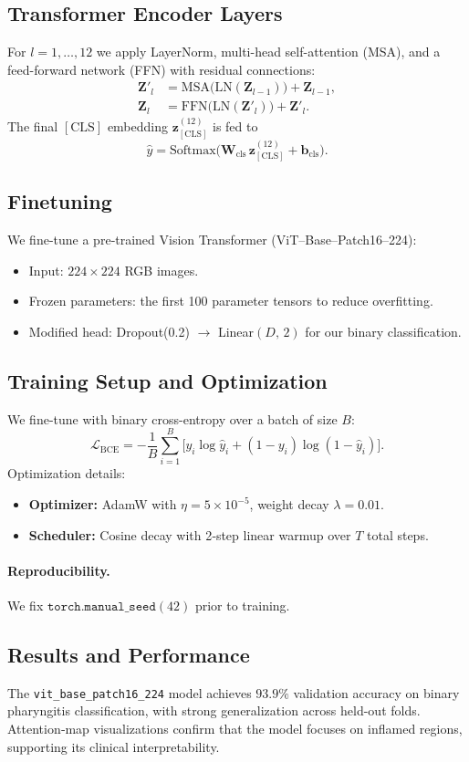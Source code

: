\subsection{Transformer Encoder Layers}
For \(l=1,\dots,12\) we apply LayerNorm, multi-head self-attention (MSA), and a feed-forward network (FFN) with residual connections:
\[
  \begin{aligned}
    \mathbf{Z}'_{l} &= \mathrm{MSA}\bigl(\mathrm{LN}(\mathbf{Z}_{l-1})\bigr) + \mathbf{Z}_{l-1},\\
    \mathbf{Z}_{l}  &= \mathrm{FFN}\bigl(\mathrm{LN}(\mathbf{Z}'_{l})\bigr)  + \mathbf{Z}'_{l}.
  \end{aligned}
\]
The final \(\mathrm{[CLS]}\) embedding \(\mathbf{z}_{\mathrm{[CLS]}}^{(12)}\) is fed to
\[
  \hat{y}
  = \mathrm{Softmax}\!\bigl(\mathbf{W}_{\mathrm{cls}}\,\mathbf{z}_{\mathrm{[CLS]}}^{(12)} + \mathbf{b}_{\mathrm{cls}}\bigr).
\]

\subsection{Finetuning}
We fine-tune a pre‐trained Vision Transformer (ViT–Base–Patch16–224):
\begin{itemize}
  \item Input: $224\times224$ RGB images.
  \item Frozen parameters: the first 100 parameter tensors to reduce overfitting.
  \item Modified head: Dropout(0.2) \(\to\) Linear$(D,\,2)$ for our binary classification.
\end{itemize}

\subsection{Training Setup and Optimization}
We fine-tune with binary cross-entropy over a batch of size \(B\):
\[
  \mathcal{L}_{\mathrm{BCE}}
  = -\frac{1}{B}\sum_{i=1}^B
    \bigl[y_i\log\hat{y}_i + (1 - y_i)\log(1 - \hat{y}_i)\bigr].
\]
Optimization details:
\begin{itemize}
  \item \textbf{Optimizer:} AdamW with \(\eta=5\times10^{-5}\), weight decay \(\lambda=0.01\).  
  \item \textbf{Scheduler:} Cosine decay with 2‐step linear warmup over \(T\) total steps.  
\end{itemize}

\paragraph{Reproducibility.} We fix \(\texttt{torch.manual\_seed}(42)\) prior to training.

\subsection{Results and Performance}
The \texttt{vit\_base\_patch16\_224} model achieves \(\mathbf{93.9\%}\) validation accuracy on binary pharyngitis classification, with strong generalization across held-out folds. Attention‐map visualizations confirm that the model focuses on inflamed regions, supporting its clinical interpretability.